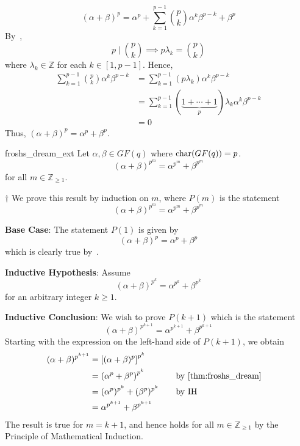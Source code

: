 \begin{Proof}{}{}
    \[ (\alpha + \beta)^p=\alpha^p+\sum\limits_{k=1}^{p-1}
        \binom{p}{k}\alpha^k\beta^{p-k}+\beta^p \]
    By~,
    \[ p\mid \binom{p}{k}\implies p\lambda_k=\binom{p}{k} \]
    where $ \lambda_k\in\mathbb{Z} $ for each $ k\in[1,p-1] $. Hence,
    \begin{align*}
        \sum\limits_{k=1}^{p-1}\binom{p}{k}\alpha^k\beta^{p-k}
         & = \sum\limits_{k=1}^{p-1} (p\lambda_k) \alpha^k\beta^{p-k}                          \\
         & =\sum\limits_{k=1}^{p-1} (\underbrace{1+\cdots+1}_{p})\lambda_k \alpha^k\beta^{p-k} \\
         & =0
    \end{align*}
    Thus, $ (\alpha + \beta)^p=\alpha^p+\beta^p $.
\end{Proof}

\begin{Corollary}{}{froshs_dream_ext}
    Let $ \alpha,\beta\in GF(q) $ where $ \operatorname{char}(GF(q))=p $.
    \[ (\alpha+\beta)^{p^m}=\alpha^{p^m}+\beta^{p^m} \]
    for all $ m\in\mathbb{Z}_{\geqslant 1} $.
\end{Corollary}

\begin{Proof}{}{} $ \dagger $
    We prove this result by induction on $ m $, where $ P(m) $ is the statement
    \[ (\alpha+\beta)^{p^m}=\alpha^{p^m}+\beta^{p^m} \]

    \textbf{Base Case}: The statement $ P(1) $ is given by
    \[ (\alpha+\beta)^{p}=\alpha^p+\beta^p \]
    which is clearly true by~.

    \textbf{Inductive Hypothesis}: Assume
    \[ (\alpha+\beta)^{p^k}=\alpha^{p^k}+\beta^{p^k} \]
    for an arbitrary integer $ k\geqslant 1 $.

    \textbf{Inductive Conclusion}: We wish to prove $ P(k+1) $
    which is the statement
    \[ (\alpha+\beta)^{p^{k+1}}=\alpha^{p^{k+1}}+\beta^{p^{k+1}} \]
    Starting with the expression on the left-hand side of $ P(k+1) $,
    we obtain
    \[ \begin{aligned}
            (\alpha+\beta)^{p^{k+1}}
             & =\left[ (\alpha+\beta)^{p} \right]^{p^{k}}                                             \\
             & =\left( \alpha^p+\beta^p \right)^{p^k}     & \quad & \text{by~\Cref{thm:froshs_dream}} \\
             & = (\alpha^p)^{p^k}+(\beta^p)^{p^k}         &       & \text{by IH}                      \\
             & =\alpha^{p^{k+1}}+\beta^{p^{k+1}}
        \end{aligned}
    \]
    The result is true for $ m=k+1 $, and hence holds for all $ m\in\mathbb{Z}_{\geqslant 1} $
    by the Principle of Mathematical Induction.
\end{Proof}

